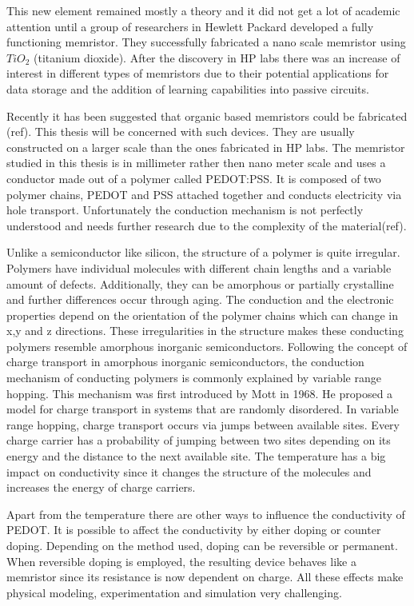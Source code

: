 \begin{doublespace}
This new element remained mostly a theory and it did not get a lot of academic attention until a group of researchers in Hewlett Packard developed a fully functioning memristor. They successfully fabricated a nano scale memristor using $TiO_2$ (titanium dioxide). After the discovery in HP labs there was an increase of interest in different types of memristors due to their potential applications for data storage and the addition of learning capabilities into passive circuits. 

Recently it has been suggested that organic based memristors could be fabricated (ref). This thesis will be concerned with such devices. They are usually constructed on a larger scale than the ones fabricated in HP labs. The memristor studied in this thesis is in millimeter rather then nano meter scale and uses a conductor made out of a polymer called PEDOT:PSS. It is composed of two polymer chains, PEDOT and PSS attached together and conducts electricity via hole transport. Unfortunately the conduction mechanism is not perfectly understood and needs further research due to the complexity of the material(ref).

Unlike a semiconductor like silicon, the structure of a polymer is quite irregular. Polymers have individual molecules with different chain lengths and a variable amount of defects.
Additionally, they can be amorphous or partially crystalline and further differences occur through aging. The conduction and the electronic properties depend on the orientation of the polymer chains which can change in x,y and z directions. These irregularities in the structure makes these conducting polymers resemble amorphous inorganic semiconductors. Following the concept of charge transport in amorphous inorganic semiconductors, the conduction mechanism of conducting polymers is commonly explained by variable range hopping. This mechanism was first introduced by Mott in 1968. He proposed a model for charge transport in systems that are randomly disordered. In variable range hopping, charge transport occurs via jumps between available sites. Every charge carrier has a probability of jumping between two sites depending on its energy and the distance to the next available site. The temperature has a big impact on conductivity since it changes the structure of the molecules and increases the energy of charge carriers.

Apart from the temperature there are other ways to influence the conductivity of PEDOT. It is possible to affect the conductivity by either doping or counter doping. Depending on the method used, doping can be reversible or permanent. When reversible doping is employed, the resulting device behaves like a memristor since its resistance is now dependent on charge. All these effects make physical modeling, experimentation and simulation very challenging. 


\end{doublespace}
